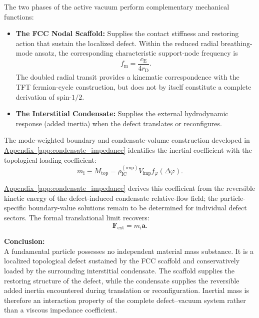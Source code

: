 The two phases of the active vacuum perform complementary mechanical functions:
\begin{itemize}
    \item \textbf{The FCC Nodal Scaffold:} Supplies the contact stiffness and restoring action that sustain the localized defect. Within the reduced radial breathing-mode ansatz, the corresponding characteristic support-node frequency is
    \begin{equation}
        f_{\mathrm{m}} = \frac{c_{\mathrm{E}}}{4r_{\mathrm{D}}}.
    \end{equation}
    The doubled radial transit provides a kinematic correspondence with the TFT fermion-cycle construction, but does not by itself constitute a complete derivation of spin-$1/2$.
    
    \item \textbf{The Interstitial Condensate:} Supplies the external hydrodynamic response (added inertia) when the defect translates or reconfigures.
\end{itemize}

The mode-weighted boundary and condensate-volume construction developed in \hyperref[app:condensate_impedance]{Appendix~\ref*{app:condensate_impedance}} identifies the inertial coefficient with the topological loading coefficient:
\begin{equation}
    m_{\mathrm{i}} \equiv M_{\mathrm{top}} = \rho_{\mathrm{IC}}^{(\mathrm{imp})} V_{\mathrm{imp}} f_{\varphi}(\Delta\varphi).
\end{equation}

\hyperref[app:condensate_impedance]{Appendix~\ref*{app:condensate_impedance}} derives this coefficient from the reversible kinetic energy of the defect-induced condensate relative-flow field; the particle-specific boundary-value solutions remain to be determined for individual defect sectors. The formal translational limit recovers:
\begin{equation}
    \mathbf{F}_{\mathrm{ext}} = m_{\mathrm{i}}\mathbf{a}.
\end{equation}

\noindent\textbf{Conclusion:}\\
A fundamental particle possesses no independent material mass substance. It is a localized topological defect sustained by the FCC scaffold and conservatively loaded by the surrounding interstitial condensate. The scaffold supplies the restoring structure of the defect, while the condensate supplies the reversible added inertia encountered during translation or reconfiguration. Inertial mass is therefore an interaction property of the complete defect--vacuum system rather than a viscous impedance coefficient.

